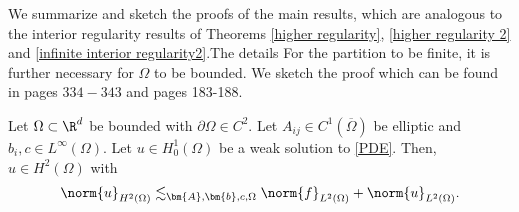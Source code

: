 \documentclass[
    a4paper,
    DIV=14,
    abstract=true,
    numbers=noenddot
]{scrartcl}
\begin{document}
We summarize and sketch the proofs of the main results, which are analogous to the interior regularity results of Theorems \ref{higher regularity}, \ref{higher regularity 2} and \ref{infinite interior regularity2}.The details For the partition to be finite, it is further necessary for $\Omega $ to be bounded.  We sketch the proof which can be found in \cite{evans2022partial} pages $334-343$ and \cite{gilbarg1977elliptic} pages 183-188.
\begin{theorem}\label{improved regularity boundary}
    Let $\Omega \subset \R^d$ be bounded with $ \partial \Omega  \in   C^2$. Let $A_{ij} \in C^{1}(\overline{\Omega})$ be elliptic and $b_i,c \in L^\infty(\Omega)$. Let $u \in H^1_0(\Omega)$ be a weak solution to \eqref{PDE}. Then, $u \in H^2(\Omega)$ with
    \begin{align*}
        \norm{u}_{H^2(\Omega)} \lesssim_{\bm{A},\bm{b},c, \Omega } \norm{f}_{L^2(\Omega)}+\norm{u}_{L^2(\Omega)}.
    \end{align*}
\end{theorem}
\end{document}
